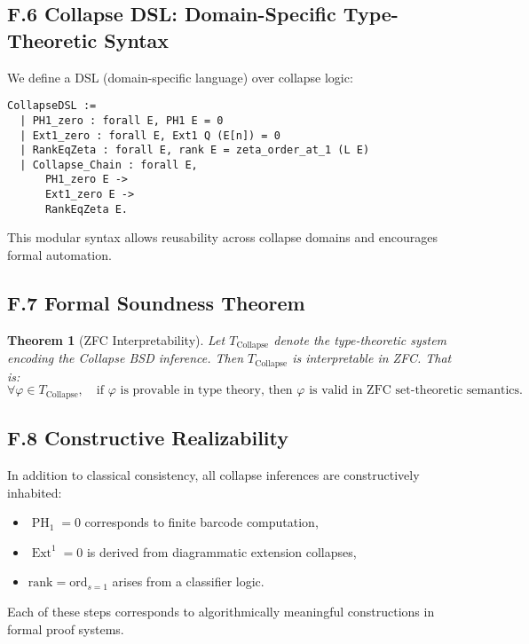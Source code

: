 \documentclass[11pt]{article}
\newtheorem{theorem}{Theorem}[section]
\DeclareMathOperator{\Ext}{Ext}
\DeclareMathOperator{\PH}{PH}
\begin{document}
\subsection*{F.6 Collapse DSL: Domain-Specific Type-Theoretic Syntax}

We define a DSL (domain-specific language) over collapse logic:

\begin{lstlisting}[language=Coq]
CollapseDSL :=
  | PH1_zero : forall E, PH1 E = 0
  | Ext1_zero : forall E, Ext1 Q (E[n]) = 0
  | RankEqZeta : forall E, rank E = zeta_order_at_1 (L E)
  | Collapse_Chain : forall E,
      PH1_zero E ->
      Ext1_zero E ->
      RankEqZeta E.
\end{lstlisting}


This modular syntax allows reusability across collapse domains and encourages formal automation.

\subsection*{F.7 Formal Soundness Theorem}

\begin{theorem}[ZFC Interpretability]
Let $T_{\mathrm{Collapse}}$ denote the type-theoretic system encoding the Collapse BSD inference.  
Then $T_{\mathrm{Collapse}}$ is interpretable in ZFC. That is:
\[
\forall \varphi \in T_{\mathrm{Collapse}},\quad \text{if } \varphi \text{ is provable in type theory, then } \varphi \text{ is valid in ZFC set-theoretic semantics.}
\]
\end{theorem}

\subsection*{F.8 Constructive Realizability}

In addition to classical consistency, all collapse inferences are constructively inhabited:

\begin{itemize}
  \item $\PH_1 = 0$ corresponds to finite barcode computation,
  \item $\Ext^1 = 0$ is derived from diagrammatic extension collapses,
  \item $\mathrm{rank} = \mathrm{ord}_{s=1}$ arises from a classifier logic.
\end{itemize}

Each of these steps corresponds to algorithmically meaningful constructions in formal proof systems.
\end{document}
